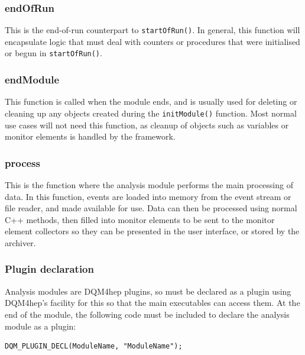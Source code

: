 

\subsubsection{endOfRun}
This is the end-of-run counterpart to \texttt{startOfRun()}. In general, this function will encapsulate logic that must deal with counters or procedures that were initialised or begun in \texttt{startOfRun()}.

\subsubsection{endModule}
This function is called when the module ends, and is usually used for deleting or cleaning up any objects created during the \texttt{initModule()} function. Most normal use cases will not need this function, as cleanup of objects such as variables or monitor elements is handled by the framework.

\subsubsection{process}
This is the function where the analysis module performs the main processing of data. In this function, events are loaded into memory from the event stream or file reader, and made available for use. Data can then be processed using normal C++ methods, then filled into monitor elements to be sent to the monitor element collectors so they can be presented in the user interface, or stored by the archiver.

\subsubsection{Plugin declaration}
Analysis modules are \acrshort{DQM4hep} plugins, so must be declared as a plugin using \acrshort{DQM4hep}'s facility for this so that the main executables can access them. At the end of the module, the following code must be included to declare the analysis module as a plugin:

\begin{lstlisting}
DQM_PLUGIN_DECL(ModuleName, "ModuleName");
\end{lstlisting}

